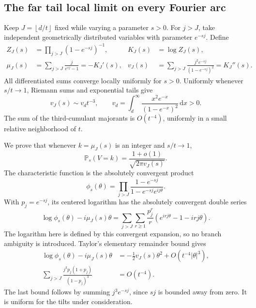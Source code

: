 \documentclass[11pt,letterpaper]{article}
\numberwithin{equation}{section}
\theoremstyle{remark}\newtheorem{remark}[theorem]{Remark}
\newcommand{\PP}{\mathbb P}
\newcommand{\floor}[1]{\left\lfloor #1\right\rfloor}
\newcommand{\dd}{\,\mathrm d}
\begin{document}
\subsection{The far tail local limit on every Fourier arc}\label{dgp:airy:sec:fourier}
Keep $J=\floor{d/t}$ fixed while varying a parameter $s>0$.
For $j>J$, take independent geometrically distributed variables with
parameter $e^{-sj}$. Define
\begin{align*}
 Z_J(s)&=\prod_{j>J}(1-e^{-sj})^{-1},& K_J(s)&=\log Z_J(s),\\
 \mu_J(s)&=\sum_{j>J}\frac j{e^{sj}-1}=-K_J'(s),&
 v_J(s)&=\sum_{j>J}\frac{j^2e^{-sj}}{(1-e^{-sj})^2}=K_J''(s).
\end{align*}
All differentiated sums converge locally uniformly for $s>0$.
Uniformly whenever $s/t\to1$, Riemann sums and exponential tails give
\begin{equation}\label{dgp:airy:eq:variance}
 v_J(s)\sim v_dt^{-3},\qquad
 v_d=\int_d^\infty\frac{x^2e^{-x}}{(1-e^{-x})^2}\dd x>0.
\end{equation}
The sum of the third-cumulant majorants is $O(t^{-4})$, uniformly in
a small relative neighborhood of $t$.

We prove that whenever $k=\mu_J(s)$ is an integer and $s/t\to1$,
\begin{equation}\label{dgp:airy:eq:llt}
 \PP_s(V=k)=\frac{1+o(1)}{\sqrt{2\pi v_J(s)}}.
\end{equation}
The characteristic function is the absolutely convergent product
\[
 \phi_s(\theta)=\prod_{j>J}
            \frac{1-e^{-sj}}{1-e^{-sj}e^{ij\theta}}.
\]
With $p_j=e^{-sj}$, its centered logarithm has the absolutely
convergent double series
\begin{equation}\label{dgp:airy:eq:doublelog}
 \log\phi_s(\theta)-i\mu_J(s)\theta
 =\sum_{j>J}\sum_{r\geq1}\frac{p_j^r}{r}
                  (e^{irj\theta}-1-irj\theta).
\end{equation}
The logarithm here is defined by this convergent expansion, so no
branch ambiguity is introduced. Taylor's elementary remainder bound
gives
\begin{align}
 \log\phi_s(\theta)-i\mu_J(s)\theta
 &=-\tfrac12v_J(s)\theta^2+O(t^{-4}|\theta|^3),\label{dgp:airy:eq:central}\\
 \sum_{j>J}\frac{j^3p_j(1+p_j)}{(1-p_j)^3}&=O(t^{-4}).\nonumber
\end{align}
The last bound follows by summing $j^3e^{-sj}$, since $sj$ is bounded
away from zero. It is uniform for the tilts under consideration.
\end{document}
